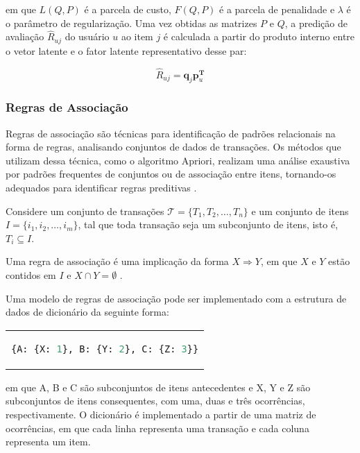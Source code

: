 em que $L(Q,P)$ é a parcela de custo, $F(Q,P)$ é a parcela de penalidade e
$\lambda$ é o parâmetro de regularização. Uma vez obtidas as matrizes $P$ e $Q$,
a predição de avaliação $\hat{R}_{uj}$ do usuário $u$ ao item $j$ é calculada a
partir do produto interno entre o vetor latente e o fator latente representativo
desse par:

\begin{equation} \label{fator_latente}
    \hat{R}_{uj} = \mathbf{q}_j \mathbf{p}_u^{\mathbf{T}}
\end{equation}


\subsubsection{Regras de Associação}
Regras de associação são técnicas para identificação de padrões relacionais
na forma de regras, analisando conjuntos de dados de transações. Os métodos que
utilizam dessa técnica, como o algoritmo Apriori, realizam uma análise exaustiva
por padrões frequentes de conjuntos ou de associação entre itens, tornando-os
adequados para identificar regras preditivas \cite{jannach2011recommender}.

Considere um conjunto de transações $\mathcal{T} = \{T_1, T_2, \dots, T_n\}$ e
um conjunto de itens $I = \{i_1, i_2, \dots, i_m\}$, tal que toda transação seja
um subconjunto de itens, isto é, $T_i \subseteq I$.

Uma regra de associação é uma
implicação da forma $X \Rightarrow Y$, em que $X$ e $Y$ estão contidos em $I$ e
$X \cap Y = \emptyset$ \cite{ordonez2011evaluating}.

Uma modelo de regras de associação
pode ser implementado com a estrutura de dados de dicionário da seguinte forma:

\begin{center}
    \begin{tabular}{c}

\begin{lstlisting}[language=Python]
    {A: {X: 1}, B: {Y: 2}, C: {Z: 3}}
\end{lstlisting}
\end{tabular}
\end{center}
em que A, B e C são subconjuntos de itens antecedentes e X, Y e Z são
subconjuntos de itens consequentes, com uma, duas e três ocorrências,
respectivamente. O dicionário é implementado a partir de uma matriz de ocorrências,
em que cada linha representa uma transação e cada coluna representa um item.

